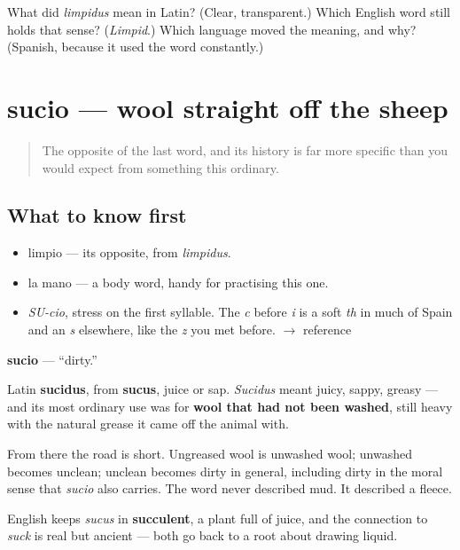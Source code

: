 \begin{tcolorbox}[breakable,colback=teal!4,colframe=teal!35!black,title={Before you move on}]
What did \emph{limpidus} mean in Latin? (Clear, transparent.) Which English word still holds that sense? (\emph{Limpid}.) Which language moved the meaning, and why? (Spanish, because it used the word constantly.)
\end{tcolorbox}
\section[sucio]{sucio — wool straight off the sheep}

\label{lesson:ES-C281-sucio}



\begin{quote}
The opposite of the last word, and its history is far more specific than you would expect from something this ordinary.
\end{quote}

\subsection*{What to know first}
\begin{itemize}
\raggedright
  \item limpio — its opposite, from \emph{limpidus}.
  \item la mano — a body word, handy for practising this one.
\end{itemize}

\begin{sounds}
\begin{itemize}
\raggedright
  \item \emph{SU-cio}, stress on the first syllable. The \emph{c} before \emph{i} is a soft \emph{th} in much of Spain and an \emph{s} elsewhere, like the \emph{z} you met before. $\to$ reference
\end{itemize}
\end{sounds}

\begin{cousinweb}
\textbf{sucio} — \textquotedblleft{}dirty.\textquotedblright{}

Latin \textbf{sucidus}, from \textbf{sucus}, juice or sap. \emph{Sucidus} meant juicy, sappy, greasy — and its most ordinary use was for \textbf{wool that had not been washed}, still heavy with the natural grease it came off the animal with.

From there the road is short. Ungreased wool is unwashed wool; unwashed becomes unclean; unclean becomes dirty in general, including dirty in the moral sense that \emph{sucio} also carries. The word never described mud. It described a fleece.

English keeps \emph{sucus} in \textbf{succulent}, a plant full of juice, and the connection to \emph{suck} is real but ancient — both go back to a root about drawing liquid.
\end{cousinweb}

